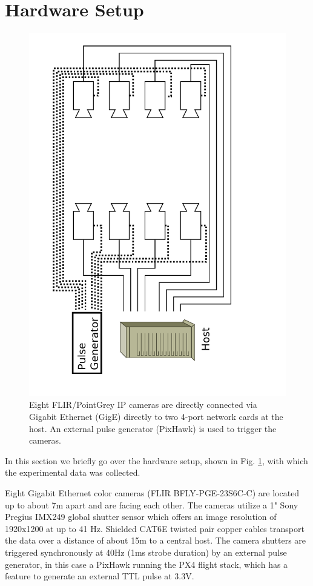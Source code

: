 \section{Hardware Setup}
\begin{figure}[h]
	\centering
	\includegraphics[angle=-90,width=\linewidth]{figures/ip_cameras.pdf}
        \caption{Eight FLIR/PointGrey IP cameras are directly
          connected via Gigabit Ethernet (GigE) directly to two 4-port
          network cards at the host. An external pulse generator
          (PixHawk) is used to trigger the cameras.}
    \label{fig:gige_setup}
\end{figure}
In this section we briefly go over the hardware setup, shown in
Fig. \ref{fig:gige_setup},  with which the experimental data was collected.

Eight Gigabit Ethernet color cameras (FLIR BFLY-PGE-23S6C-C) are located
up to about 7m apart and are facing each other. The cameras utilize a 1" Sony
Pregius IMX249 global shutter sensor which offers an image resolution of
1920x1200 at up to 41 Hz. Shielded CAT6E twisted pair copper cables
transport the data over a 
distance of about 15m to a central host. The camera shutters are
triggered synchronously at 40Hz (1ms strobe duration) by an external pulse generator, in
this case a PixHawk running the PX4 flight stack, which has a feature
to generate an external TTL pulse at 3.3V.

